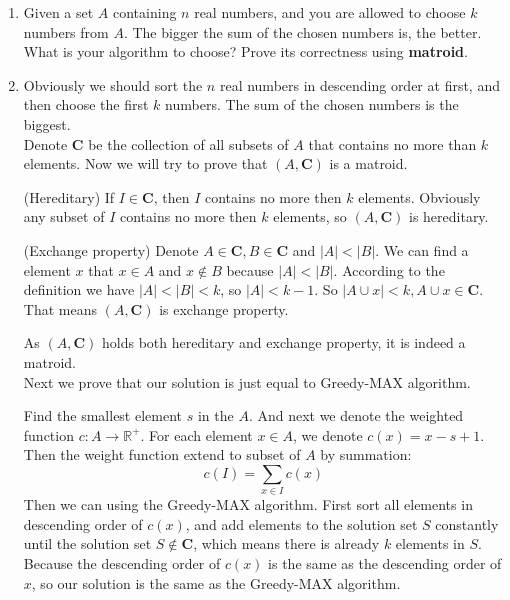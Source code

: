 \documentclass[12pt,a4paper]{article}
\makeatletter
\newtheorem*{solution}{Solution}
\theoremstyle{definition}
\renewenvironment{solution}[1][Solution] {\par\pushQED{\qed}\normalfont\topsep6\p@\@plus6\p@\relax\trivlist\item[\hskip\labelsep\bfseries#1\@addpunct{.}]\ignorespaces}{\popQED\endtrivlist\@endpefalse} \makeatother
\makeatother
\begin{document}
\begin{enumerate}
\begin{enumerate}
\begin{proof}
	    	As it holds both hereditary and exchange property, it is indeed a matroid.
	    	
	    	
	    \end{proof}

	\item
	Given a set $A$ containing $n$ real numbers, and you are allowed to choose $k$ numbers from $A$. The bigger the sum of the chosen numbers is, the better. What is your algorithm to choose? Prove its correctness using \textbf{matroid}.\par
	    \begin{solution}
	    	Obviously we should sort the $n$ real numbers in descending order at first, and then choose the first $k$ numbers. The sum of the chosen numbers is the biggest.\\
	    	
	        Denote $\mathbf{C}$ be the collection of all subsets of $A$ that contains no more than $k$ elements. Now we will try to prove that  $(A,\mathbf{C})$ is a matroid.
	        
	        (Hereditary) If $I \in \mathbf{C}$, then $I$ contains no more then $k$ elements. Obviously any subset of $I$ contains no more then $k$ elements, so $(A,\mathbf{C})$ is hereditary.
	        
	        (Exchange property) Denote $A \in \mathbf{C}, B \in \mathbf{C}$ and $|A| < |B|$. We can find a element $x$ that $x \in A$ and $x \notin B$ because $|A| < |B|$. According to the definition we have $|A|<|B|<k$, so $|A| < k-1$. So $|A \cup {x}| < k, A\cup {x} \in \mathbf{C}$. That means $(A,\mathbf{C})$ is exchange property.
	        
	        As $(A,\mathbf{C})$ holds both hereditary and exchange property, it is indeed a matroid.\\
	        
	        Next we prove that our solution is just equal to Greedy-MAX algorithm.
	        
	        Find the smallest element $s$ in the $A$. And next we denote the weighted function $c:A \rightarrow \mathbb{R}^+$. For each element $x \in A$, we denote $c(x) = x - s + 1$. Then the weight function extend to subset of $A$ by summation:
	        $$c(I) = \sum_{x\in I}c(x)$$
	        Then we can using the Greedy-MAX algorithm. First sort all elements in descending order of $c(x)$, and add elements to the solution set $S$ constantly until the solution set $S \notin  \textbf{C}$, which means there is already $k$ elements in $S$. Because the descending order of $c(x)$ is the same as the descending order of $x$, so our solution is the same as the Greedy-MAX algorithm.
	        

\end{solution}
\end{enumerate}
\end{enumerate}
\end{document}
